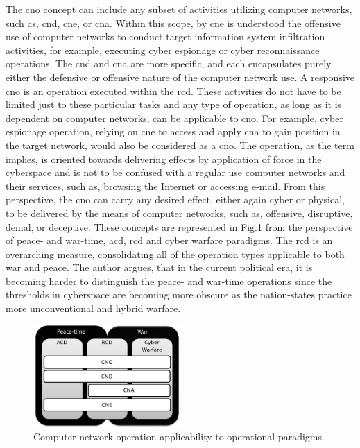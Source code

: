 The \gls{cno} concept can include any subset of activities utilizing computer networks, such as, \gls{cnd}, \gls{cne}, or \gls{cna}. Within this scope, by \gls{cne} is understood the offensive use of computer networks to conduct target information system infiltration activities, for example, executing cyber espionage or cyber reconnaissance operations. The \gls{cnd} and \gls{cna} are more specific, and each encapsulates purely either the defensive or offensive nature of the computer network use. A responsive \gls{cno} is an operation executed within the \gls{rcd}. These activities do not have to be limited just to these particular tasks and any type of operation, as long as it is dependent on computer networks, can be applicable to \gls{cno}. For example, cyber espionage operation, relying on \gls{cne} to access and apply \gls{cna} to gain position in the target network, would also be considered as a \gls{cno}. The operation, as the term implies, is oriented towards delivering effects by application of force in the cyberspace and is not to be confused with a regular use computer networks and their services, such as, browsing the Internet or accessing e-mail. From this perspective, the \gls{cno} can carry any desired effect, either again cyber or physical, to be delivered by the means of computer networks, such as, offensive, disruptive, denial, or deceptive.
These concepts are represented in Fig.\ref{fig:cno} from the perspective of peace- and war-time, \gls{acd}, \gls{rcd} and cyber warfare paradigms. The \gls{rcd} is an overarching measure, consolidating all of the operation types applicable to both war and peace. The author argues, that in the current political era, it is becoming harder to distinguish the peace- and war-time operations since the thresholds in cyberspace are becoming more obscure as the nation-states practice more unconventional and hybrid warfare.

\begin{figure}[!htb]
    \centering
    \includegraphics[width=0.5\textwidth]{./img/cno.jpg}
    \caption{Computer network operation applicability to operational paradigms}
    \label{fig:cno}
\end{figure}

